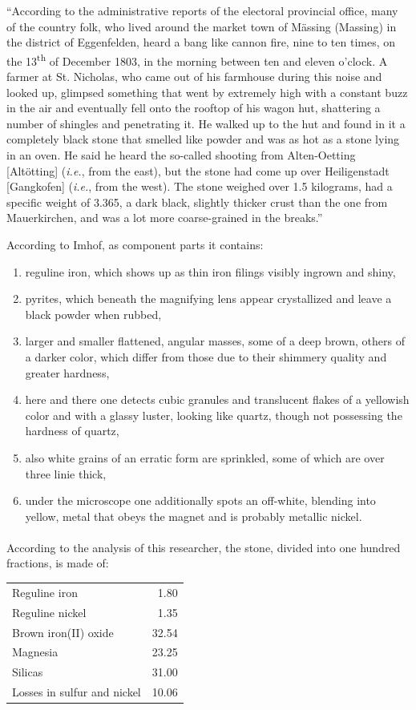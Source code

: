 \documentclass[a4paper, 12pt, oneside]{article}
\begin{document}
``According to the administrative reports of the electoral provincial office, many of the country folk, who lived around the market town of Mässing (Massing) in the district of Eggenfelden, heard a bang like cannon fire, nine to ten times, on the 13\textsuperscript{th} of December 1803, in the morning between ten and eleven o'clock. A farmer at St. Nicholas, who came out of his farmhouse during this noise and looked up, glimpsed something that went by extremely high with a constant buzz in the air and eventually fell onto the rooftop of his wagon hut, shattering a number of shingles and penetrating it. He walked up to the hut and found in it a completely black stone that smelled like powder and was as hot as a stone lying in an oven. He said he heard the so-called shooting from Alten-Oetting [Altötting] (\emph{i.e.}, from the east), but the stone had come up over Heiligenstadt [Gangkofen] (\emph{i.e.}, from the west). The stone weighed over 1.5 kilograms, had a specific weight of 3.365, a dark black, slightly thicker crust than the one from Mauerkirchen, and was a lot more coarse-grained in the breaks.''

According to Imhof, as component parts it contains:
\begin{enumerate}
    \item reguline iron, which shows up as thin iron filings visibly ingrown and shiny,
    \item pyrites, which beneath the magnifying lens appear crystallized and leave a black powder when rubbed,
    \item larger and smaller flattened, angular masses, some of a deep brown, others of a darker color, which differ from those due to their shimmery quality and greater hardness,
    \item here and there one detects cubic granules and translucent flakes of a yellowish color and with a glassy luster, looking like quartz, though not possessing the hardness of quartz,
    \item also white grains of an erratic form are sprinkled, some of which are over three linie thick,
    \item under the microscope one additionally spots an off-white, blending into yellow, metal that obeys the magnet and is probably metallic nickel.
\end{enumerate}
\paragraph*{}
According to the analysis of this researcher, the stone, divided into one hundred fractions, is made of:
\begin{center}
    \begin{tabular}{l r}
        Reguline iron & 1.80\\
        Reguline nickel & 1.35\\
        Brown iron(II) oxide & 32.54\\
        Magnesia & 23.25\\
        Silicas & 31.00\\
        Losses in sulfur and nickel & 10.06\\
    \end{tabular}
\end{center}
\end{document}
